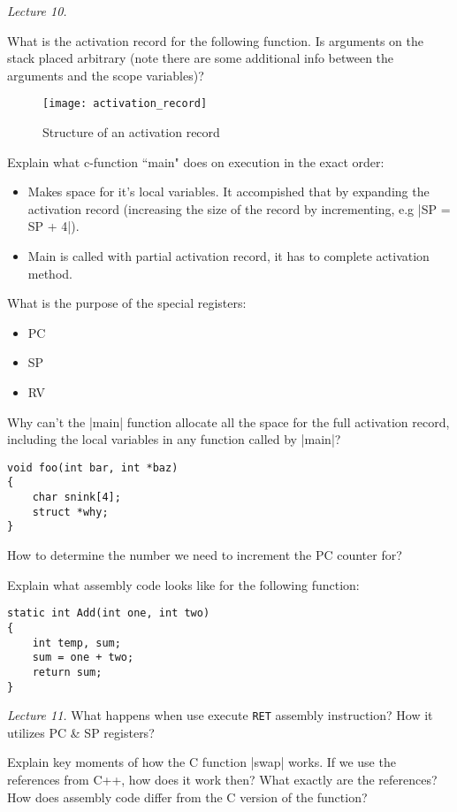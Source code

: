 \textit{Lecture 10.}

What is the activation record for the following function. Is arguments on the
stack placed arbitrary (note there are some additional info between the
arguments and the scope variables)?

\begin{figure}[h]
    \centering
    \texttt{[image: activation\_record]}
    \caption{Structure of an activation record}%
    \label{fig:activation_record}
\end{figure}

Explain what c-function ``main" does on execution in the exact order:
\begin{itemize}
    \item  Makes space for it's local variables. It accompished that by
        expanding the activation record (increasing the size of the record by
        incrementing, e.g |SP = SP + 4|).
    \item Main is called with partial activation record, it has to complete
        activation method.
\end{itemize}

What is the purpose of the special registers:
\begin{itemize}
    \item PC
    \item SP
    \item RV
\end{itemize}

Why can't the |main| function allocate all the space for the full activation
record, including the local variables in any function called by |main|?

\begin{lstlisting}
void foo(int bar, int *baz)
{
    char snink[4];
    struct *why;
}
\end{lstlisting}

How to determine the number we need to increment the PC counter for?

Explain what assembly code looks like for the following function:

\begin{lstlisting}
static int Add(int one, int two)
{
    int temp, sum;
    sum = one + two;
    return sum;
}
\end{lstlisting}

\textit{Lecture 11.}
What happens when use execute \verb!RET! assembly instruction? How it utilizes
PC \& SP registers?

Explain key moments of how the C function |swap| works. If we use the
references from C++, how does it work then? What exactly are the references?
How does assembly code differ from the C version of the function?

